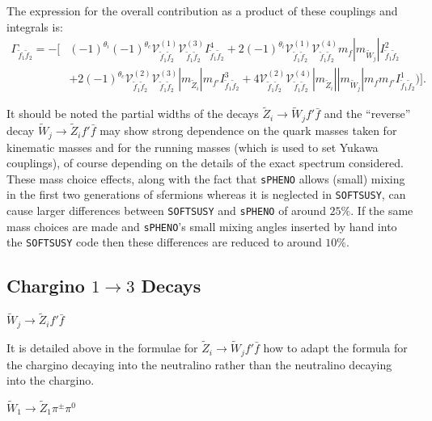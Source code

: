 \documentclass[final,3p,times]{elsarticle}
\begin{document}
The expression for the overall contribution as a product of these couplings and integrals is:
\begin{equation} 
\begin{aligned}
\Gamma_{\tilde{f}_1 \tilde{f}_2} = - \Big[ & (-1)^{\theta_i}(-1)^{\theta_c}\mathcal{V}_{\tilde{f}_1 \tilde{f}_2}^{(1)} \mathcal{V}_{\tilde{f}_1 \tilde{f}_2}^{(3)} I_{\tilde{f}_1 \tilde{f}_2}^{4} + 2(-1)^{\theta_i}\mathcal{V}_{\tilde{f}_1 \tilde{f}_2}^{(1)} \mathcal{V}_{\tilde{f}_1 \tilde{f}_2}^{(4)} m_{f} |m_{\tilde{W}_j}| I_{\tilde{f}_1 \tilde{f}_2}^{2} \\ & + 2(-1)^{\theta_c} \mathcal{V}_{\tilde{f}_1 \tilde{f}_2}^{(2)} \mathcal{V}_{\tilde{f}_1 \tilde{f}_2}^{(3)} |m_{\tilde{Z}_i}| m_{f'} I_{\tilde{f}_1 \tilde{f}_2}^{3} + 4 \mathcal{V}_{\tilde{f}_1 \tilde{f}_2}^{(2)} \mathcal{V}_{\tilde{f}_1 \tilde{f}_2}^{(4)} |m_{\tilde{Z}_i}||m_{\tilde{W}_j}|m_{f} m_{f'} I_{\tilde{f}_1 \tilde{f}_2}^{1}) \Big].
\end{aligned}
\end{equation}

It should be noted the partial widths of the decays $\tilde{Z}_i \rightarrow \tilde{W}_j f' \bar{f}$ and the ``reverse'' decay $\tilde{W}_j \rightarrow \tilde{Z}_i f' \bar{f}$ may show strong dependence on the quark masses taken for kinematic masses and for the running masses (which is used to set Yukawa couplings), of course depending on the details of the exact spectrum considered. These mass choice effects, along with the fact that {\tt sPHENO} allows (small) mixing in the first two generations of sfermions whereas it is neglected in {\tt SOFTSUSY}, can cause larger differences between {\tt SOFTSUSY} and {\tt sPHENO} of around $25\%$. If the same mass choices are made and {\tt sPHENO}'s small mixing angles inserted by hand into the {\tt SOFTSUSY} code then these differences are reduced to around $10\%$.

\subsection{Chargino $1 \rightarrow 3$ Decays}

\textbf{\underline{$\tilde{W}_j \rightarrow \tilde{Z}_i f' \bar{f}$}}

It is detailed above in the formulae for $\tilde{Z}_i \rightarrow \tilde{W}_j
f' \bar{f}$ how to adapt the formula for the chargino decaying into the
neutralino rather than the neutralino decaying into the chargino. 

\textbf{\underline{$\tilde{W}_1 \rightarrow \tilde{Z}_1 \pi^\pm \pi^0$}}
\end{document}
